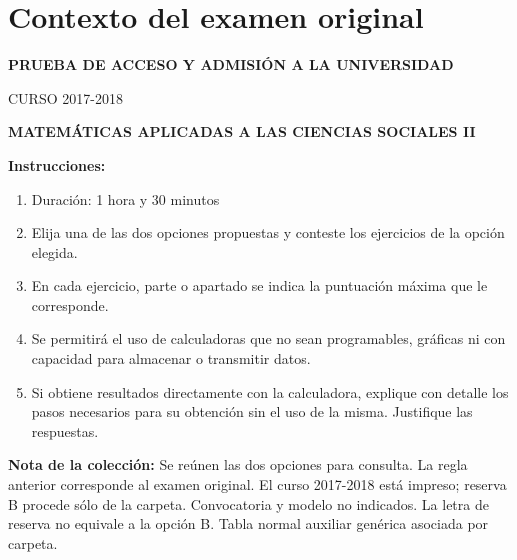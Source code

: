 \section*{Contexto del examen original}
\textbf{PRUEBA DE ACCESO Y ADMISIÓN A LA UNIVERSIDAD}\par
CURSO 2017-2018\par
\textbf{MATEMÁTICAS APLICADAS A LAS CIENCIAS SOCIALES II}

\textbf{Instrucciones:}
\begin{enumerate}[label=\textbf{\alph*)}]
  \item Duración: 1 hora y 30 minutos
  \item Elija una de las dos opciones propuestas y conteste los ejercicios de la opción elegida.
  \item En cada ejercicio, parte o apartado se indica la puntuación máxima que le corresponde.
  \item Se permitirá el uso de calculadoras que no sean programables, gráficas ni con capacidad para almacenar o transmitir datos.
  \item Si obtiene resultados directamente con la calculadora, explique con detalle los pasos necesarios para su obtención sin el uso de la misma. Justifique las respuestas.
\end{enumerate}
\noindent\textbf{Nota de la colección:} Se reúnen las dos opciones para consulta.
La regla anterior corresponde al examen original. El curso 2017-2018 está impreso; reserva B procede sólo de la carpeta. Convocatoria y modelo no indicados. La letra de reserva no equivale a la opción B. Tabla normal auxiliar genérica asociada por carpeta.
\par\medskip
